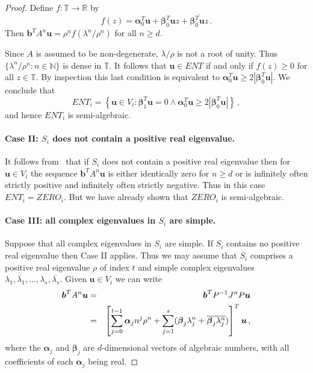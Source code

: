 \begin{proof}
Define $f:\mathbb{T}\rightarrow\mathbb{R}$ by
\[ f(z)=\boldsymbol{\alpha}_0^T\boldsymbol{u}+
\boldsymbol{\beta}_0^T\boldsymbol{u}z+
\overline{\boldsymbol{\beta}_0^T\boldsymbol{u}z} \, .\]
Then $\boldsymbol{b}^TA^n\boldsymbol{u} = \rho^n f(\lambda^n/\rho^n)$ for all $n\geq d$.

Since $A$ is assumed to be non-degenerate, $\lambda/\rho$ is not a
root of unity.  Thus $\{\lambda^n/\rho^n:n\in\mathbb{N}\}$ is dense in
$\mathbb{T}$.  It follows that $\boldsymbol{u}\in\mathit{ENT}$ if and
only if $f(z)\geq 0$ for all $z\in\mathbb{T}$.  By inspection this
last condition is equivalent to $\boldsymbol{\alpha}_0^T\boldsymbol{u}
\geq 2|\boldsymbol{\beta}_0^T\boldsymbol{u}|$.
We conclude that
\[ \mathit{ENT}_i = \left\{ \boldsymbol{u}\in V_i :
\boldsymbol{\beta}_1^T\boldsymbol{u}=0 \wedge
\boldsymbol{\alpha}_0^T\boldsymbol{u} \geq 2|\boldsymbol{\beta}_0^T\boldsymbol{u}| \right\} \, ,\]
and hence $\mathit{ENT}_i$ is semi-algebraic.

\paragraph{Case II: $S_i$ does not contain a positive real eigenvalue.}
It follows from~\cite[Lemma 4]{Bra06} that if $S_i$ does not contain a
positive real eigenvalue then for $\boldsymbol{u}\in V_i$ the sequence
$\boldsymbol{b}^TA^n\boldsymbol{u}$ is either identically zero for $n\geq
d$ or is infinitely often strictly positive and infinitely often
strictly negative.  Thus in this case
$\mathit{ENT}_i=\mathit{ZERO}_i$.  But we have already shown that
$\mathit{ZERO}_i$ is semi-algebraic.


\paragraph{Case III: all complex eigenvalues in $S_i$ are simple.}
Suppose that all complex eigenvalues in $S_i$ are simple.  If $S_i$
contains no positive real eigenvalue then Case II applies.  Thus we
may assume that $S_i$ comprises a positive real eigenvalue $\rho$ of
index $t$ and simple complex eigenvalues
$\lambda_1,\overline{\lambda_1},\ldots,\lambda_s,\overline{\lambda_s}$.
Given $\boldsymbol{u}\in V_i$ we can write
\begin{eqnarray}
\boldsymbol{b}^TA^n\boldsymbol{u} &=& \boldsymbol{b}^TP^{-1}J^nP\boldsymbol{u}
\notag\\
&=& \left[\sum_{j=0}^{t-1} \boldsymbol{\alpha}_j n^j \rho^n + \sum_{j=1}^s
(\boldsymbol{\beta}_j \lambda_j^n + \overline{\boldsymbol{\beta}_j \lambda^n_j})
\right]^T\boldsymbol{u} \, ,
\label{eq:exp-poly}
\end{eqnarray}
where the $\boldsymbol{\alpha}_j$ and $\boldsymbol{\beta}_j$ are
$d$-dimensional vectors of algebraic numbers, with all coefficients of
each $\boldsymbol{\alpha}_j$ being real.


\end{proof}
